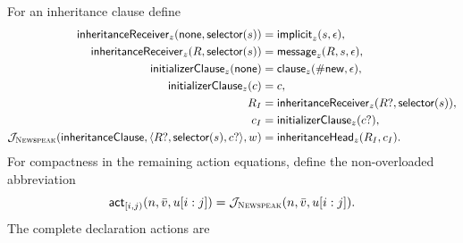 For an inheritance clause define
\begin{equation}\label{eq:newspeak-inheritance-actions}
\begin{aligned}
 \mathsf{inheritanceReceiver}_{z}(\mathsf{none},\mathsf{selector}(s))
   &=\mathsf{implicit}_{z}(s,\epsilon),\\
 \mathsf{inheritanceReceiver}_{z}(R,\mathsf{selector}(s))
   &=\mathsf{message}_{z}(R,s,\epsilon),\\
 \mathsf{initializerClause}_{z}(\mathsf{none})&=
   \mathsf{clause}_{z}(\#\mathsf{new},\epsilon),\\
 \mathsf{initializerClause}_{z}(c)&=c,\\
 R_I&=\mathsf{inheritanceReceiver}_{z}(R?,\mathsf{selector}(s)),\\
 c_I&=\mathsf{initializerClause}_{z}(c?),\\
 \mathcal J_{\textsc{Newspeak}}(\mathsf{inheritanceClause},
      \langle R?,\mathsf{selector}(s),c?\rangle,w)
   &=\mathsf{inheritanceHead}_{z}(R_I,c_I).
\end{aligned}
\end{equation}
For compactness in the remaining action equations, define the non-overloaded
abbreviation
\begin{equation}\label{eq:newspeak-action-abbreviation}
 \mathsf{act}_{[i,j)}(n,\bar v,u[i:j])
   =\mathcal J_{\textsc{Newspeak}}(n,\bar v,u[i:j]).
\end{equation}
The complete declaration actions are

